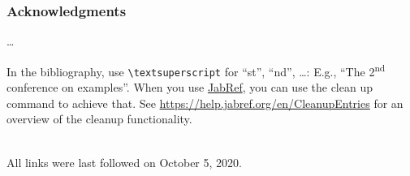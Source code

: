 \documentclass[runningheads,a4paper,english]{llncs}[2018/03/10]
\begin{document}
\subsubsection*{Acknowledgments}
\ldots


In the bibliography, use \texttt{\textbackslash textsuperscript} for \enquote{st}, \enquote{nd}, \ldots:
E.g., \enquote{The 2\textsuperscript{nd} conference on examples}.
When you use \href{https://www.jabref.org}{JabRef}, you can use the clean up command to achieve that.
See \url{https://help.jabref.org/en/CleanupEntries} for an overview of the cleanup functionality.

\renewcommand{\bibsection}{\section*{References}} %

\begingroup
  \small %
  
\endgroup

\ \\
%
All links were last followed on October 5, 2020.
\end{document}
